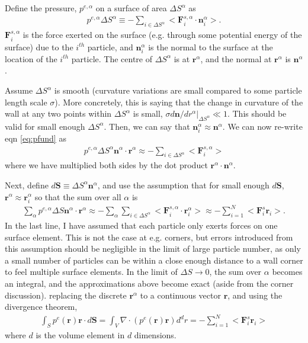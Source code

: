 \documentclass[twocolumn,amsmath,amssymb,aps]{revtex4-1}%
\begin{document}
Define the pressure, $p^{e,\alpha}$ on a surface of area
$\Delta S^{\alpha}$ as
\begin{align}\label{eq:pfund}
  p^{e,\alpha}\Delta S^{\alpha}
  \equiv -\sum_{i\in\Delta S^{\alpha}}
  <\bm{F}_i^{s,{\alpha}}\cdot\bm{n}_i^{\alpha}>.
\end{align}
$\bm{F}_i^{s,{\alpha}}$ is the force exerted on the surface
(e.g. through some potential energy of the surface) due to
the $i^{th}$ particle, and $\bm{n}_i^{\alpha}$ is the normal
to the surface at the location of the $i^{th}$ particle. The
centre of $\Delta S^{\alpha}$ is at $\bm{r}^{\alpha}$, and
the normal at $\bm{r}^{\alpha}$ is $\bm{n}^{\alpha}$.

Assume $\Delta S^{\alpha}$ is smooth (curvature variations
are small compared to some particle length scale $\sigma$).
More concretely, this is saying that the change in curvature
of the wall at any two points within $\Delta S^{\alpha}$ is
small, $\sigma d\bm{n}/dr^{\alpha}|_{\Delta S^{\alpha}}\ll 1$.
This should be valid for small enough $\Delta S^{\alpha}$.
Then, we can say that
$\bm{n}_i^{\alpha}\approx\bm{n}^{\alpha}$. We can now re-write
eqn \ref{eq:pfund} as
\begin{align}
  p^{e,\alpha}\Delta S^{\alpha}\bm{n}^{\alpha}
  \cdot\bm{r}^{\alpha}
  \approx -\sum_{i\in\Delta S^{\alpha}}<\bm{F}_i^{s,\alpha}>
\end{align}
where we have multiplied both sides by the dot product
$\bm{r}^{\alpha}\cdot\bm{n}^{\alpha}$.

Next, define $d\bm{S}\equiv\Delta S^{\alpha}\bm{n}^{\alpha}$,
and use the assumption that for small enough $d\bm{S}$,
$\bm{r}^{\alpha}\approx\bm{r}_i^{\alpha}$ so that the sum over
all $\alpha$ is
\begin{align}
  \sum_{\alpha}p^{e,\alpha}\Delta S\bm{n}^{\alpha}
  \cdot\bm{r}^{\alpha}
  \approx -\sum_{\alpha}\sum_{i\in\Delta S^{\alpha}}
  <\bm{F}_i^{s,\alpha}\cdot\bm{r}_i^{\alpha}>
  \approx-\sum_{i=1}^{N}<\bm{F}_i^{s}\bm{r}_i>.
\end{align}
In the last line, I have assumed that each particle only
exerts forces on one surface element. This is not the case
at e.g. corners, but errors introduced from this assumption
should be negligible in the limit of large particle number,
as only a small number of particles can be within a close
enough distance to a wall corner to feel multiple surface
elements. In the limit of $\Delta S\to 0$, the sum over
$\alpha$ becomes an integral, and the approximations above
become exact (aside from the corner discussion).
replacing the discrete $\bm{r}^{\alpha}$ to a continuous
vector $\bm{r}$, and using the divergence theorem,
\begin{align}
  \int_{S} p^e(\bm{r})\bm{r}\cdot d\bm{S}
  =\int_V\nabla\cdot(p^e(\bm{r})\bm{r})d^dr
  =-\sum_{i=1}^{N}<\bm{F}_i^{s}\bm{r}_i>
\end{align}
where $d$ is the volume element in $d$ dimensions.
\end{document}
